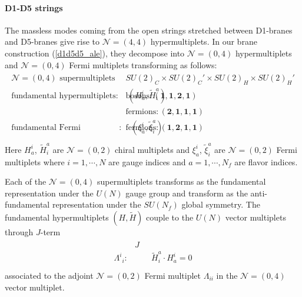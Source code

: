 \documentclass{article}
\numberwithin{equation}{section}
\begin{document}
\paragraph{D1-D5 strings}
The massless modes coming from the open strings stretched between 
D1-branes and D5-branes give rise to $\mathcal{N}=(4,4)$ hypermultiplets. 
In our brane construction (\ref{d1d5d5_ale}), 
they decompose into $\mathcal{N}=(0,4)$ hypermultiplets and $\mathcal{N}=(0,4)$ Fermi multiplets 
transforming as follows: 
\begin{align}
\label{d1d5a_modes}
\begin{array}{c|c}
\textrm{$\mathcal{N}=(0,4)$ supermultiplets}& SU(2)_{C}\times SU(2)_{C}'\times SU(2)_{H}\times SU(2)_{H}' \\ \hline 
\textrm{fundamental hypermultiplets}:\quad (H^{i}_{a}, \widetilde{H}_{i}^{a})
&\textrm{bosons}: (\bm{1}, \bm{1},\bm{2},\bm{1}) \\
&\textrm{fermions}: (\bm{2}, \bm{1},\bm{1},\bm{1}) \\ \hline 
\textrm{fundamental Fermi multiplets}:\quad (\xi^{i}_{a},\widetilde{\xi}_{i}^{a})
&\textrm{fermions}: (\bm{1}, \bm{2},\bm{1},\bm{1}) \\
\end{array}
\end{align}
Here $H^{i}_{a}$, $\widetilde{H}_{i}^{a}$ are $\mathcal{N}=(0,2)$ chiral multiplets 
and $\xi^{i}_{a}$, $\widetilde{\xi}_{i}^{a}$ are $\mathcal{N}=(0,2)$ Fermi multiplets 
where $i=1,\cdots, N$ are gauge indices and $a=1,\cdots, N_{f}$ are flavor indices. 



Each of the $\mathcal{N}=(0,4)$ supermultiplets transforms 
as the fundamental representation under the $U(N)$ gauge group 
and transform as the anti-fundamental representation under the $SU(N_{f})$ global symmetry. 
The fundamental hypermultiplets $(H,\widetilde{H})$ couple to the $U(N)$ vector multiplets through $J$-term 
\begin{align}
\label{j_d1d5}
\begin{array}{cc}
&J\\
{\Lambda^{i}}_{i}:& \qquad \widetilde{H}_{i}^{a}\cdot H^{i}_{a}=0\\
\end{array}
\end{align}
associated to the adjoint $\mathcal{N}=(0,2)$ Fermi multiplet $\Lambda_{ii}$ in the $\mathcal{N}=(0,4)$ vector multiplet. 
\end{document}
